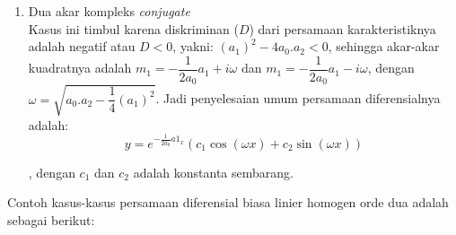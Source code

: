 \begin{enumerate}[1.]
	\item Dua akar kompleks \textit{conjugate} \\
	Kasus ini timbul karena diskriminan (\begin{math} D \end{math}) dari persamaan karakteristiknya adalah negatif atau \begin{math} D < 0\end{math}, yakni: \begin{math} (a_1)^{2} - 4 a_0 . a_2 < 0 \end{math}, sehingga akar-akar kuadratnya adalah \begin{math} m_1
	= -\dfrac{1}{2 a_0} a_1 + i \omega \end{math} dan \begin{math} m_1 = -\dfrac{1}{2 a_0} a_1 - i \omega \end{math}, dengan \begin{math} \omega = \sqrt{a_0 . a_2 - \dfrac{1}{4}(a_1)^{2}} \end{math}. Jadi penyelesaian umum persamaan diferensialnya adalah: \\

	\begin{equation} y =e^{-\frac{1}{2 a_0} a1_x} (c_1 \cos (\omega x) + c_2 \sin (\omega x))\end{equation}

	, dengan \begin{math} c_1 \end{math} dan \begin{math} c_2 \end{math} adalah konstanta sembarang.

\end{enumerate}

Contoh kasus-kasus persamaan diferensial biasa linier homogen orde dua adalah sebagai berikut:

